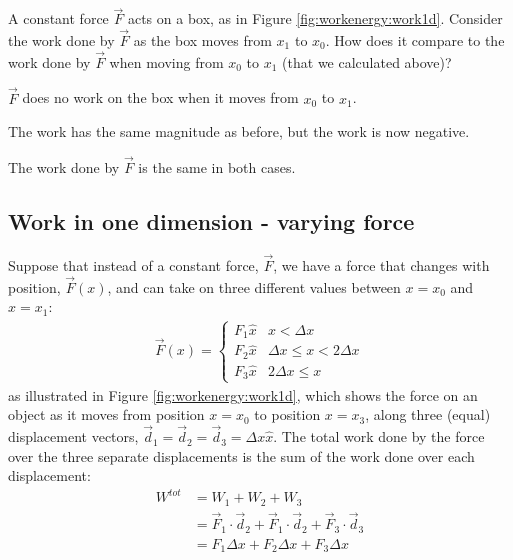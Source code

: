 \begin{checkpoint}
\begin{MCquestion}
{A constant force $\vec F$ acts on a box, as in Figure \ref{fig:workenergy:work1d}. Consider the work done by $\vec F$ as the box moves from $x_1$ to $x_0$. How does it compare to the work done by $\vec F$ when moving from $x_0$ to $x_1$ (that we calculated above)?}
\item $\vec F$ does no work on the box when it moves from $x_0$ to $x_1$. 
\item The work has the same magnitude as before, but the work is now negative. %
\item The work done by $\vec F$ is the same in both cases.
\end{MCquestion}
\end{checkpoint}

\subsection{Work in one dimension - varying force}
Suppose that instead of a constant force, $\vec F$, we have a force that changes with position, $\vec F(x)$, and can take on three different values between $x=x_0$ and $x=x_1$:
\begin{align*}
  \vec F (x)=
  \begin{cases}
    F_1\hat x & x<\Delta x \\
    F_2\hat x & \Delta x \leq x< 2\Delta x \\
    F_3\hat x & 2\Delta x \leq x
  \end{cases}
\end{align*}
as illustrated in Figure \ref{fig:workenergy:work1d}, which shows the force on an object as it moves from position $x=x_0$ to position $x=x_3$, along three (equal) displacement vectors, $\vec d_1=\vec d_2=\vec d_3=\Delta x \hat x$. 
The total work done by the force over the three separate displacements is the sum of the work done over each displacement:
\begin{align*}
W^{tot}&=W_1+W_2+W_3\\
&=\vec F_1\cdot \vec d_2+\vec F_1\cdot \vec d_2+\vec F_3\cdot \vec d_3\\
&= F_1\Delta x +F_2\Delta x + F_3\Delta x
\end{align*} 

